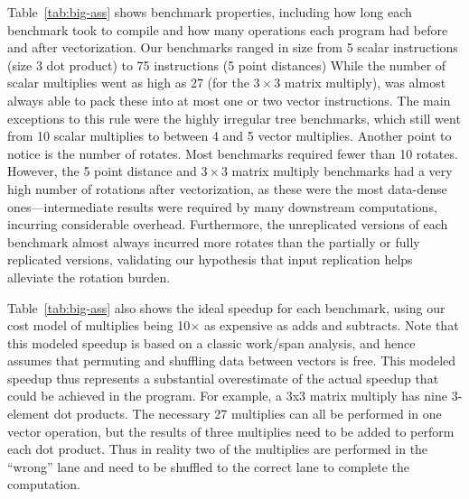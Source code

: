 Table~\ref{tab:big-ass} shows benchmark properties, including how long each benchmark took to compile and how many operations each program had before and after vectorization.
Our benchmarks ranged in size from 5 scalar instructions (size 3 dot product) to 75 instructions (5 point distances) %
While the number of scalar multiplies went as high as 27 (for the $3\times 3$ matrix multiply), \system was almost always able to pack these into at most one or two vector instructions.
The main exceptions to this rule were the highly irregular tree benchmarks, which still went from 10 scalar multiplies to between 4 and 5 vector multiplies.
Another point to notice is the number of rotates. Most benchmarks required fewer than 10 rotates. However, the 5 point distance and $3\times 3$ matrix multiply benchmarks had a very high number of rotations after vectorization, as these were the most data-dense ones---intermediate results were required by many downstream computations, incurring considerable overhead. %
Furthermore, the unreplicated versions of each benchmark almost always incurred more rotates than the partially or fully replicated versions, validating our hypothesis that input replication helps alleviate the rotation burden. %

Table~\ref{tab:big-ass} also shows the ideal speedup for each benchmark, using our cost model of multiplies being 10$\times$ as expensive as adds and subtracts. Note that this modeled speedup is based on a classic work/span analysis, and hence assumes that permuting and shuffling data between vectors is free. This modeled speedup thus represents a substantial overestimate of the actual speedup that could be achieved in the program. For example, a \textsf{3x3} matrix multiply has nine 3-element dot products. The necessary 27 multiplies can all be performed in one vector operation, but the results of three multiplies need to be added to perform each dot product. Thus in reality two of the multiplies are performed in the ``wrong'' lane and need to be shuffled to the correct lane to complete the computation.

